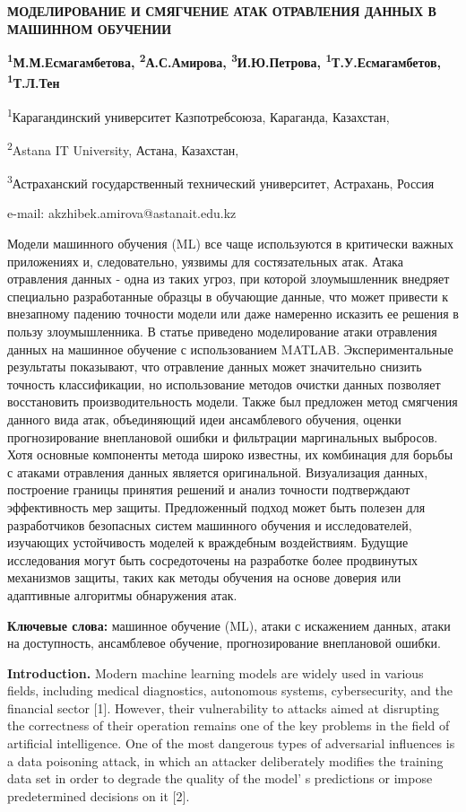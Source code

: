 {\bfseries МОДЕЛИРОВАНИЕ И СМЯГЧЕНИЕ АТАК ОТРАВЛЕНИЯ ДАННЫХ В МАШИННОМ
ОБУЧЕНИИ}

{\bfseries \textsuperscript{1}М.М.Есмагамбетова,
\textsuperscript{2}А.С.Амирова\textsuperscript{\envelope },
\textsuperscript{3}И.Ю.Петрова, \textsuperscript{1}Т.У.Есмагамбетов,
\textsuperscript{1}Т.Л.Тен}

\textsuperscript{1}Карагандинский университет Казпотребсоюза, Караганда,
Казахстан,

\textsuperscript{2}Astana IT University, Астана, Казахстан,

\textsuperscript{3}Астраханский государственный технический университет,
Астрахань, Россия

e-mail: akzhibek.amirova@astanait.edu.kz

Модели машинного обучения (ML) все чаще используются в критически важных
приложениях и, следовательно, уязвимы для состязательных атак. Атака
отравления данных - одна из таких угроз, при которой злоумышленник
внедряет специально разработанные образцы в обучающие данные, что может
привести к внезапному падению точности модели или даже намеренно
исказить ее решения в пользу злоумышленника. В статье приведено
моделирование атаки отравления данных на машинное обучение с
использованием MATLAB. Экспериментальные результаты показывают, что
отравление данных может значительно снизить точность классификации, но
использование методов очистки данных позволяет восстановить
производительность модели. Также был предложен метод смягчения данного
вида атак, объединяющий идеи ансамблевого обучения, оценки
прогнозирование внеплановой ошибки и фильтрации маргинальных выбросов.
Хотя основные компоненты метода широко известны, их комбинация для
борьбы с атаками отравления данных является оригинальной. Визуализация
данных, построение границы принятия решений и анализ точности
подтверждают эффективность мер защиты. Предложенный подход может быть
полезен для разработчиков безопасных систем машинного обучения и
исследователей, изучающих устойчивость моделей к враждебным
воздействиям. Будущие исследования могут быть сосредоточены на
разработке более продвинутых механизмов защиты, таких как методы
обучения на основе доверия или адаптивные алгоритмы обнаружения атак.

{\bfseries Ключевые слова:} машинное обучение (ML), атаки с искажением
данных, атаки на доступность, ансамблевое обучение, прогнозирование
внеплановой ошибки.

{\bfseries Introduction.} Modern machine learning models are widely used in
various fields, including medical diagnostics, autonomous systems,
cybersecurity, and the financial sector {[}1{]}. However, their
vulnerability to attacks aimed at disrupting the correctness of their
operation remains one of the key problems in the field of artificial
intelligence. One of the most dangerous types of adversarial influences
is a data poisoning attack, in which an attacker deliberately modifies
the training data set in order to degrade the quality of the
model' s predictions or impose predetermined decisions on
it {[}2{]}.

